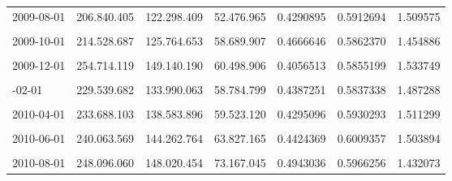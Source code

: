 \documentclass[12pt]{article}
\begin{document}
\begin{longtable}[t]{llllrrr}
2009-08-01 & 206.840.405 & 122.298.409 & 52.476.965 & 0.4290895 & 0.5912694 & 1.509575\\
\addlinespace
\cellcolor{gray!10}{2009-09-01} & \cellcolor{gray!10}{214.465.555} & \cellcolor{gray!10}{128.696.321} & \cellcolor{gray!10}{59.929.225} & \cellcolor{gray!10}{0.4656639} & \cellcolor{gray!10}{0.6000792} & \cellcolor{gray!10}{1.471982}\\
2009-10-01 & 214.528.687 & 125.764.653 & 58.689.907 & 0.4666646 & 0.5862370 & 1.454886\\
\cellcolor{gray!10}{2009-11-01} & \cellcolor{gray!10}{225.273.361} & \cellcolor{gray!10}{132.771.238} & \cellcolor{gray!10}{64.365.940} & \cellcolor{gray!10}{0.4847883} & \cellcolor{gray!10}{0.5893783} & \cellcolor{gray!10}{1.436069}\\
2009-12-01 & 254.714.119 & 149.140.190 & 60.498.906 & 0.4056513 & 0.5855199 & 1.533749\\
\cellcolor{gray!10}{2010-01-01} & \cellcolor{gray!10}{231.954.830} & \cellcolor{gray!10}{135.496.822} & \cellcolor{gray!10}{59.192.317} & \cellcolor{gray!10}{0.4368539} & \cellcolor{gray!10}{0.5841518} & \cellcolor{gray!10}{1.490230}\\
\addlinespace
2010-02-01 & 229.539.682 & 133.990.063 & 58.784.799 & 0.4387251 & 0.5837338 & 1.487288\\
\cellcolor{gray!10}{2010-03-01} & \cellcolor{gray!10}{234.321.660} & \cellcolor{gray!10}{139.746.208} & \cellcolor{gray!10}{62.134.815} & \cellcolor{gray!10}{0.4446261} & \cellcolor{gray!10}{0.5963862} & \cellcolor{gray!10}{1.495254}\\
2010-04-01 & 233.688.103 & 138.583.896 & 59.523.120 & 0.4295096 & 0.5930293 & 1.511299\\
\cellcolor{gray!10}{2010-05-01} & \cellcolor{gray!10}{236.231.009} & \cellcolor{gray!10}{141.194.428} & \cellcolor{gray!10}{63.650.729} & \cellcolor{gray!10}{0.4508020} & \cellcolor{gray!10}{0.5976964} & \cellcolor{gray!10}{1.488657}\\
2010-06-01 & 240.063.569 & 144.262.764 & 63.827.165 & 0.4424369 & 0.6009357 & 1.503894\\
\addlinespace
\cellcolor{gray!10}{2010-07-01} & \cellcolor{gray!10}{241.185.103} & \cellcolor{gray!10}{142.448.893} & \cellcolor{gray!10}{63.792.132} & \cellcolor{gray!10}{0.4478247} & \cellcolor{gray!10}{0.5906206} & \cellcolor{gray!10}{1.483957}\\
2010-08-01 & 248.096.060 & 148.020.454 & 73.167.045 & 0.4943036 & 0.5966256 & 1.432073\\

\end{longtable}
\end{document}
